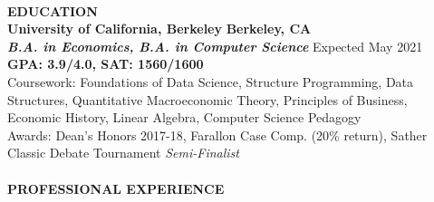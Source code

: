 \documentclass[10.5pt]{article}
\begin{document}

\begin{center}
\begin{title}
\\
\begin{title}
\end{title}
\end{title}
\end{center}

\textbf{\large{EDUCATION}}\\
\textbf{University of California, Berkeley}
\hfill
\textbf{Berkeley, CA}\\
\textbf{\textit{B.A. in Economics, B.A. in Computer Science}}
\hfill
Expected May 2021\\
\textbf{GPA: 3.9/4.0, SAT: 1560/1600}\\
Coursework: Foundations of Data Science, Structure Programming, Data Structures, Quantitative Macroeconomic Theory, Principles of Business, Economic History, Linear Algebra, Computer Science Pedagogy\\
Awards: Dean's Honors 2017-18, Farallon Case Comp. (20\% return), Sather Classic Debate Tournament \textit{Semi-Finalist}\
\\~\\


\textbf{\large{PROFESSIONAL EXPERIENCE}}\\
\end{document}
